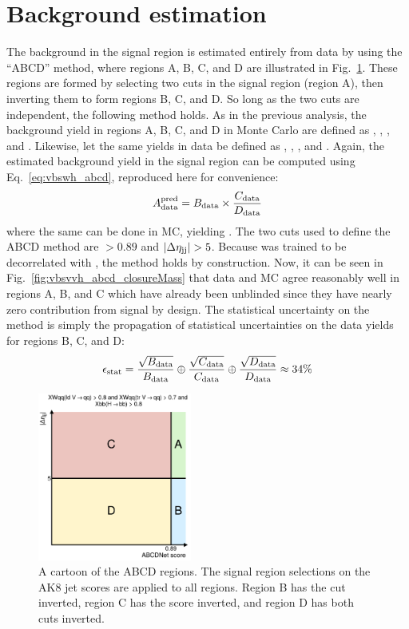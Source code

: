 \section{Background estimation}
The background in the signal region is estimated entirely from data by using the ``ABCD'' method, where regions A, B, C, and D are illustrated in Fig.~\ref{fig:vbsvvh_abcd}. %
These regions are formed by selecting two cuts in the signal region (region A), then inverting them to form regions B, C, and D. 
So long as the two cuts are independent, the following method holds. 
As in the previous analysis, the background yield in regions A, B, C, and D in Monte Carlo are defined as \AMC, \BMC, \CMC, and \DMC.
Likewise, let the same yields in data be defined as  \Adata, \Bdata, \Cdata, and \Ddata.
Again, the estimated background yield in the signal region \AdataPred can be computed using Eq.~\ref{eq:vbswh_abcd}, reproduced here for convenience:
\begin{equation*}
    A_{\text{data}}^{\text{pred}} = B_{\text{data}}\times\frac{C_{\text{data}}}{D_{\text{data}}}
\end{equation*}
where the same can be done in MC, yielding \AMCPred. 
The two cuts used to define the ABCD method are \ABCDNet $> 0.89$ and $|\Delta\eta_{\mathrm{j}\mathrm{j}}| > 5$. 
Because \ABCDNet was trained to be decorrelated with \detajj, the method holds by construction. 
Now, it can be seen in Fig.~\ref{fig:vbsvvh_abcd_closureMass} that data and MC agree reasonably well in regions A, B, and C which have already been unblinded since they have nearly zero contribution from signal by design. 
The statistical uncertainty \Estat on the method is simply the propagation of statistical uncertainties on the data yields for regions B, C, and D:
\begin{equation}\label{eq:vbsvvh_statUnc}
    \epsilon_{\text{stat}} = \frac{\sqrt{B_{\text{data}}}}{B_{\text{data}}} \oplus \frac{\sqrt{C_{\text{data}}}}{C_{\text{data}}} \oplus \frac{\sqrt{D_{\text{data}}}}{D_{\text{data}}} \approx 34\% 
\end{equation}

\begin{figure}[htb]
    \centering
    \includegraphics[width=0.45\textwidth]{fig/vbsvvh/ABCD_abcdnet_score_gt_0p89_vs_abs_deta_jj_gt_5p0.pdf}
    \caption[A cartoon of the ABCD regions]{
        A cartoon of the ABCD regions. 
        The signal region selections on the AK8 jet \ParticleNet scores are applied to all regions. 
        Region B has the \detajj cut inverted, region C has the \ABCDNet score inverted, and region D has both cuts inverted. 
    }
    \label{fig:vbsvvh_abcd}
\end{figure}


